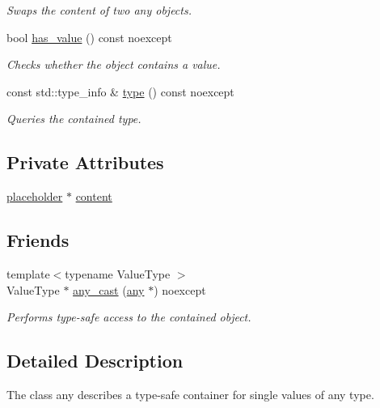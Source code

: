 \begin{DoxyCompactItemize}
\begin{DoxyCompactList}\small\item\em Swaps the content of two any objects. \end{DoxyCompactList}\item 
bool \mbox{\hyperlink{classbfl_1_1any_1_1any_a6ec222b8ae338c3392b0538ec1d94766}{has\+\_\+value}} () const noexcept
\begin{DoxyCompactList}\small\item\em Checks whether the object contains a value. \end{DoxyCompactList}\item 
const std\+::type\+\_\+info \& \mbox{\hyperlink{classbfl_1_1any_1_1any_ad84c3b30ce2ed9d04fe28465b60f2500}{type}} () const noexcept
\begin{DoxyCompactList}\small\item\em Queries the contained type. \end{DoxyCompactList}\end{DoxyCompactItemize}
\subsection*{Private Attributes}
\begin{DoxyCompactItemize}
\item 
\mbox{\hyperlink{classbfl_1_1any_1_1any_1_1placeholder}{placeholder}} $\ast$ \mbox{\hyperlink{classbfl_1_1any_1_1any_a3b81eea753ab84d245b0b360bcb38540}{content}}
\end{DoxyCompactItemize}
\subsection*{Friends}
\begin{DoxyCompactItemize}
\item 
{\footnotesize template$<$typename Value\+Type $>$ }\\Value\+Type $\ast$ \mbox{\hyperlink{classbfl_1_1any_1_1any_a9d1312e2ae8ed7cf8cc7c93d4c6d1422}{any\+\_\+cast}} (\mbox{\hyperlink{classbfl_1_1any_1_1any}{any}} $\ast$) noexcept
\begin{DoxyCompactList}\small\item\em Performs type-\/safe access to the contained object. \end{DoxyCompactList}\end{DoxyCompactItemize}


\subsection{Detailed Description}
The class any describes a type-\/safe container for single values of any type. 

